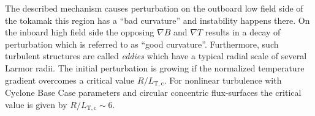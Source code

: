 The described mechanism causes perturbation on the outboard low field side of the tokamak this region has a \enquote{bad curvature} and instability happens there. On the inboard high field side the opposing $\nabla B$ and $\nabla T$ results in a decay of perturbation which is referred to as \enquote{good curvature}. Furthermore, such turbulent structures are called \textit{eddies} which have a typical radial scale of several Larmor radii. \cite{Newins2006}
The initial perturbation is growing if the normalized temperature gradient overcomes a critical value $R/L_\mathrm{T,c}$. For nonlinear turbulence with Cyclone Base Case parameters and circular concentric flux-surfaces the critical value is given by $R/L_\mathrm{T,c} \sim 6$. \cite{Dimits2000, Isliker2010}